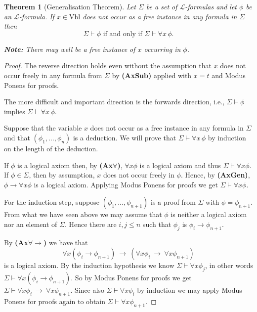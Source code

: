 \documentclass[11pt]{article}
\newcommand{\proves}{\vdash}
\newcommand{\Vbl}{\textrm{Vbl}}
\newtheorem{theorem}{Theorem}[section]
\newcommand{\mcal}[1]{\mathcal{#1}}
\begin{document}
\begin{theorem}[Generalisation Theorem]
Let $\Sigma$ be a set of $\mcal{L}$-formulas and let $\phi$ be an $\mcal{L}$-formula. If $x\in \Vbl$ does not occur as a free instance in any formula in $\Sigma$ then
\[\Sigma\proves \phi \text{ if and only if } \Sigma \proves \forall x \, \phi.\]

\noindent
\textbf{Note:} There may well be a free instance of $x$ occurring in $\phi$.
\end{theorem}
\begin{proof}
The reverse direction holds even without the assumption
that $x$ does not occur freely in any formula from $\Sigma $ by
\textbf{(AxSub)}  applied with $x=t$ and Modus Ponens for proofs.

The more difficult and important direction is the forwards direction, i.e., $\Sigma \proves \phi$ implies $\Sigma \proves \forall x \, \phi$.

Suppose that the variable $x$ does not occur as a free instance in any formula in $\Sigma$ and that $(\phi_1,\ldots, \phi_n)$ is a deduction. We will prove that $\Sigma \proves \forall x \, \phi$ by induction on the length of the deduction.

If $\phi $ is a logical axiom then, by \textbf{(Ax$\forall$)},
 $\forall x\phi $ is a logical axiom and thus
$\Sigma \vdash \forall x\phi $.
If $\phi \in \Sigma $, then by assumption, $x$ does not occur freely in $\phi $.
Hence, by \textbf{(AxGen)},
$\phi \rightarrow \forall x\phi $ is a logical axiom. Applying Modus Ponens for proofs we get
$\Sigma \vdash \forall x\phi $.

For the induction step, suppose
$(\phi _1,...,\phi _{n+1})$ is a proof from $\Sigma $
with $\phi =\phi _{n+1}$.
From what we have seen above we may assume that $\phi $ is neither
a logical axiom nor an element of $\Sigma $.
Hence there are $i,j\leq n$ such that $\phi _j$ is $\phi _i\rightarrow \phi _{n+1}$.

By {\bf (Ax${\forall\!\rightarrow}$)}
we have that
\[\forall x(\phi _i\rightarrow \phi _{n+1})\ \rightarrow \ (\forall x \phi _i\ \rightarrow \ \forall x\phi _{n+1})\]
is a logical axiom.
By the induction hypothesis we know $\Sigma \vdash \forall x\phi _j$,
in other words $\Sigma \vdash \forall x(\phi _i\rightarrow \phi _{n+1})$.
So by Modus Ponens for proofs we get
$\Sigma \vdash \forall x \phi _i\ \rightarrow \ \forall x\phi _{n+1}$.
Since also $\Sigma \vdash \forall x \phi _i$ by induction we may apply Modus Ponens for proofs again to obtain $\Sigma \vdash \forall x\phi _{n+1}$.
\end{proof}
\end{document}
